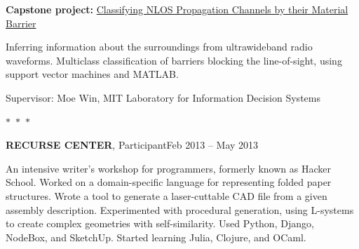 \documentclass[margin]{res}
\begin{document}
\begin{resume}
		\textbf{Capstone project:} \underline{Classifying NLOS Propagation Channels by their Material Barrier} 

		Inferring information about the surroundings from ultrawideband radio waveforms. Multiclass classification of barriers blocking the line-of-sight, using support vector machines and MATLAB.

		Supervisor: Moe Win, MIT Laboratory for Information Decision Systems

\begin{center}
  $\ast$~$\ast$~$\ast$
\end{center}

		\textbf{RECURSE CENTER}, Participant\hfill Feb 2013 --  May 2013

		An intensive writer's workshop for programmers, formerly known as Hacker School. Worked on a domain-specific language for representing folded paper structures. Wrote a tool to generate a laser-cuttable CAD file from a given assembly description. Experimented with procedural generation, using L-systems to create complex geometries with self-similarity. Used Python, Django, NodeBox, and SketchUp. Started learning Julia, Clojure, and OCaml.

\end{resume}
\end{document}
